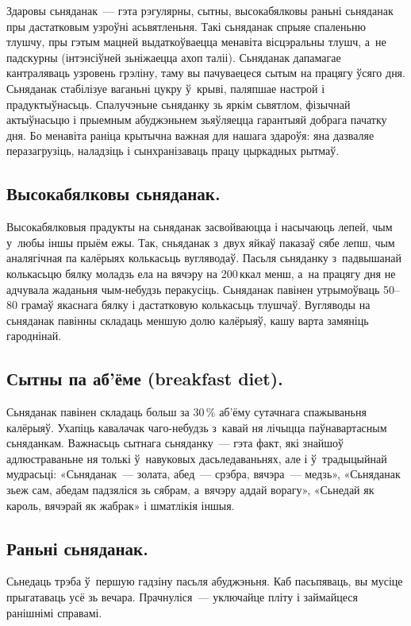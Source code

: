 Здаровы сьняданак~--- гэта рэгулярны, сытны, высокабялковы раньні сьняданак пры дастатковым узроўні асьвятленьня.
Такі сьняданак спрыяе спаленьню тлушчу, пры гэтым мацней выдаткоўваецца менавіта вісцэральны тлушч, а~не падскурны (інтэнсіўней зьніжаецца ахоп таліі). Сьняданак дапамагае кантраляваць узровень грэліну, таму вы пачуваецеся сытым на працягу ўсяго дня. Сьняданак стабілізуе ваганьні цукру ў~крыві, паляпшае настрой і прадуктыўнасьць. Спалучэньне сьняданку зь яркім сьвятлом, фізычнай актыўнасьцю і прыемным абуджэньнем зьяўляецца гарантыяй добрага пачатку дня. Бо менавіта раніца крытычна важная для нашага здароўя: яна дазваляе перазагрузіць, наладзіць і сынхранізаваць працу цыркадных рытмаў.

\subsection{Высокабялковы сьняданак.}
Высокабялковыя прадукты на сьняданак засвойваюцца і насычаюць лепей, чым у~любы іншы прыём ежы. Так, сньяданак з~двух яйкаў паказаў сябе лепш, чым аналягічная па калёрыях колькасьць вугляводаў. Пасьля сьняданку з~падвышанай колькасьцю бялку моладзь ела на вячэру на 200\,ккал менш, а~на працягу дня не адчувала жаданьня чым-небудзь перакусіць. Сьняданак павінен утрымоўваць 50--80 грамаў якаснага бялку і дастатковую колькасьць тлушчаў. Вугляводы на сьняданак павінны складаць меншую долю калёрыяў, кашу варта замяніць гароднінай.

\subsection{Сытны па аб'ёме (breakfast diet).}
Сьняданак павінен складаць больш за 30\,\% аб'ёму сутачнага спажываньня калёрыяў. Ухапіць кавалачак чаго-небудзь з~кавай ня лічыцца паўнавартасным сьняданкам. Важнасьць сытнага сьняданку~--- гэта факт, які знайшоў адлюстраваньне ня толькі ў~навуковых дасьледаваньнях, але і ў~традыцыйнай мудрасьці: «Сьняданак~--- золата, абед~--- срэбра, вячэра~--- медзь», «Сьняданак зьеж сам, абедам падзяліся зь сябрам, а~вячэру аддай ворагу», «Сьнедай як кароль, вячэрай як жабрак» і шматлікія іншыя.

\subsection{Раньні сьняданак.}
Сьнедаць трэба ў~першую гадзіну пасьля абуджэньня. Каб пасьпяваць, вы мусіце прыгатаваць усё зь вечара. Прачнуліся~--- уключайце пліту і займайцеся ранішнімі справамі.

